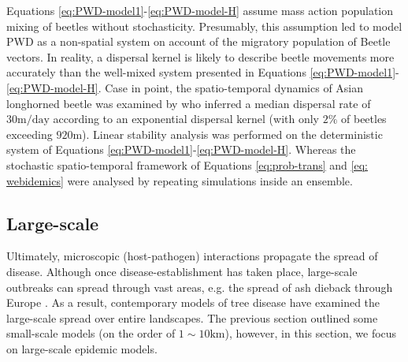 Equations \ref{eq:PWD-model1}-\ref{eq:PWD-model-H} assume mass action population mixing of beetles 
without stochasticity. Presumably, this assumption led \cite{khan2020modelling} to model PWD as a non-spatial
system on account of the migratory population of Beetle vectors. In reality, a dispersal kernel is likely to 
describe beetle movements more accurately than the well-mixed system presented in Equations 
\ref{eq:PWD-model1}-\ref{eq:PWD-model-H}. Case in point, the spatio-temporal dynamics of Asian longhorned
beetle was examined by \cite{smith2004dispersal} who inferred a median dispersal rate of $30\mathrm{m/day}$
according to an exponential dispersal kernel (with only $2\%$ of beetles exceeding $920\mathrm{m}$).
Linear stability analysis was performed on the deterministic system of Equations \ref{eq:PWD-model1}-\ref{eq:PWD-model-H}. 
Whereas the stochastic spatio-temporal framework of Equations \ref{eq:prob-trans} and \ref{eq: webidemics} 
were analysed by repeating simulations inside an ensemble.



\subsection{Large-scale}

Ultimately, microscopic (host-pathogen) interactions propagate the spread of disease. 
Although once disease-establishment has taken place, large-scale outbreaks can spread through vast
areas, e.g. the spread of ash dieback through Europe \cite{alsop2015ash}.
As a result, contemporary models of tree disease have examined the large-scale spread over entire landscapes.
The previous section outlined some small-scale models (on the order of $1 \sim 10 \mathrm{km}$), 
however, in this section, we focus on large-scale epidemic models.

